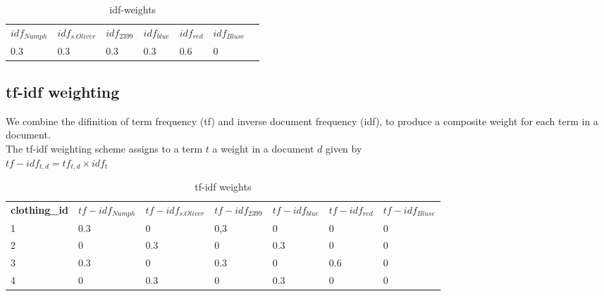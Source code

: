 \bigskip
\begin{table}[h]
    \begin{center}
    \begin{tabular}{ l l l l l l l }
        \rowcolor{Gray}
            \textbf{$idf_{Numph}$} & \textbf{$idf_{s.Oliver}$} & \textbf{$idf_{2399}$} & \textbf{$idf_{blue}$} & \textbf{$idf_{red}$} & \textbf{$idf_{Bluse}$}\\
        0.3                    & 0.3                       & 0.3                    & 0.3                   & 0.6                  & 0
    \end{tabular}
    \caption{idf-weights}
    \end{center}
\end{table}


\subsection{tf-idf weighting}
We combine the difinition of term frequency (tf) and inverse document frequency (idf), to produce a composite weight for each term in a document.\\
The tf-idf weighting scheme assigns to a term $t$ a weight in a document $d$ given by\\

$tf-idf_{t,d}= tf_{t,d} \times idf_t$

\bigskip
\begin{table}[h]
    \begin{center}
    \begin{tabular}{ l l l l l l l }
        \rowcolor{Gray}
        \textbf{clothing\_id}   & \textbf{$tf-idf_{Numph}$} & \textbf{$tf-idf_{s.Oliver}$}   & \textbf{$tf-idf_{2399}$}    & \textbf{$tf-idf_{blue}$} & \textbf{$tf-idf_{red}$} & \textbf{$tf-idf_{Bluse}$}\\
        1                       & 0.3              & 0                   &  0,3              & 0             & 0            & 0\\
        2                       & 0                & 0.3                 & 0                 & 0.3           & 0            & 0\\
        3                       & 0.3              & 0                   & 0.3               & 0             & 0.6          & 0\\
        4                       & 0                & 0.3                 & 0                 & 0.3           & 0            & 0\\
    \end{tabular}
    \caption{tf-idf weights}
    \end{center}
\end{table}










